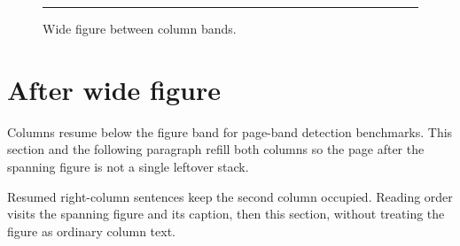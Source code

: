 \documentclass[11pt,a4paper,twocolumn]{article}
\begin{document}
\onecolumn
\begin{figure}[h]
  \centering
  \rule{0.8\textwidth}{2.5cm}
  \caption{Wide figure between column bands.}
\end{figure}

\twocolumn
\section{After wide figure}
Columns resume below the figure band for page-band detection benchmarks.
This section and the following paragraph refill both columns so the page
after the spanning figure is not a single leftover stack.

Resumed right-column sentences keep the second column occupied. Reading
order visits the spanning figure and its caption, then this section,
without treating the figure as ordinary column text.
\end{document}
